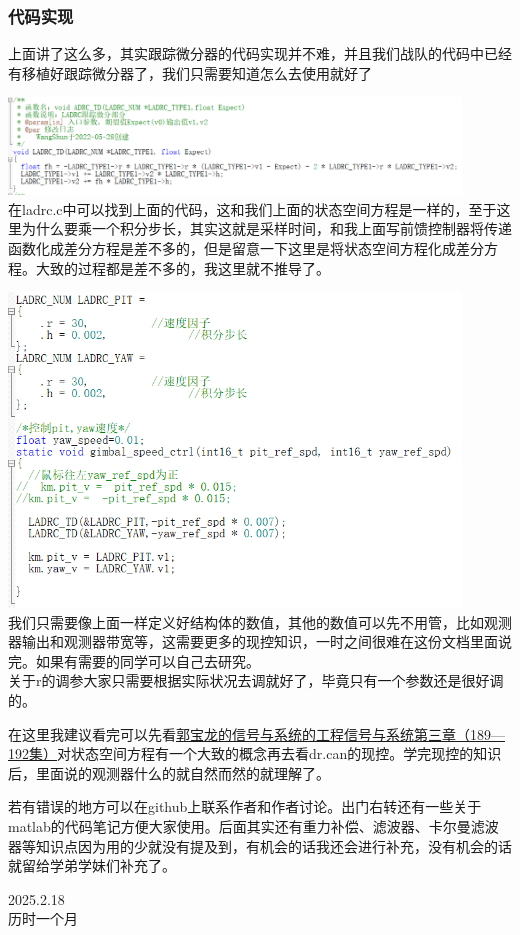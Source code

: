 \documentclass[UTF8,a4paper,12pt]{ctexart}
\begin{document}
          \subsubsection{代码实现}
          上面讲了这么多，其实跟踪微分器的代码实现并不难，并且我们战队的代码中已经有移植好跟踪微分器了，我们只需要知道怎么去使用就好了
            \par \includegraphics[width=12cm]{picture/tracking_differentiator_code.png}
              \\在ladrc.c中可以找到上面的代码，这和我们上面的状态空间方程是一样的，至于这里为什么要乘一个积分步长，其实这就是采样时间，和我上面写前馈控制器将传递函数化成差分方程是差不多的，但是留意一下这里是将状态空间方程化成差分方程。大致的过程都是差不多的，我这里就不推导了。
            \par \includegraphics[width=12cm]{picture/tracking_differentiator_code_expng.png}\\
              我们只需要像上面一样定义好结构体的数值，其他的数值可以先不用管，比如观测器输出和观测器带宽等，这需要更多的现控知识，一时之间很难在这份文档里面说完。如果有需要的同学可以自己去研究。\\
              关于r的调参大家只需要根据实际状况去调就好了，毕竟只有一个参数还是很好调的。
              \begin{flushleft}
                在这里我建议看完可以先看\href{https://www.bilibili.com/video/BV1PZ4y1t7DA?spm_id_from=333.788.videopod.episodes&vd_source=b02f21f21dd17ebeef8dac9338c9d06c&p=192}{郭宝龙的信号与系统的工程信号与系统第三章（189—192集）}对状态空间方程有一个大致的概念再去看dr.can的现控。学完现控的知识后，里面说的观测器什么的就自然而然的就理解了。
              \end{flushleft}
              



            \begin{flushleft}
              若有错误的地方可以在github上联系作者和作者讨论。出门右转还有一些关于matlab的代码笔记方便大家使用。后面其实还有重力补偿、滤波器、卡尔曼滤波器等知识点因为用的少就没有提及到，有机会的话我还会进行补充，没有机会的话就留给学弟学妹们补充了。
            \end{flushleft}
        \begin{flushright}
          2025.2.18\\
          历时一个月
        \end{flushright}
\end{document}
